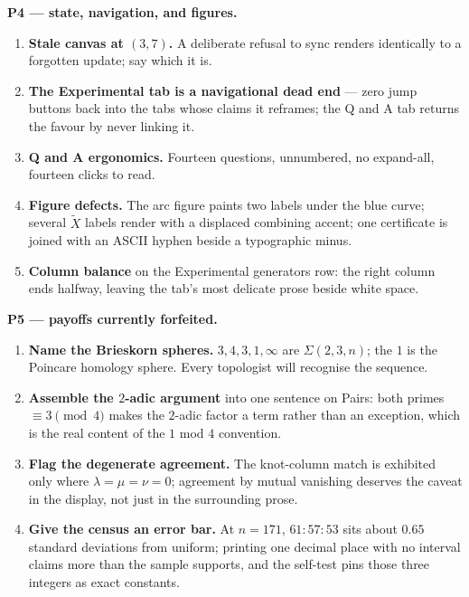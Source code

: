 \textbf{P4 --- state, navigation, and figures.}
\begin{enumerate}[leftmargin=1.4em,itemsep=2pt,resume]
\item \textbf{Stale canvas at $(3,7)$.} A deliberate refusal to sync renders identically to a forgotten update; say which it is.
\item \textbf{The Experimental tab is a navigational dead end} --- zero jump buttons back into the tabs whose claims it reframes; the Q and A tab returns the favour by never linking it.
\item \textbf{Q and A ergonomics.} Fourteen questions, unnumbered, no expand-all, fourteen clicks to read.
\item \textbf{Figure defects.} The arc figure paints two labels under the blue curve; several $\tilde{X}$ labels render with a displaced combining accent; one certificate is joined with an ASCII hyphen beside a typographic minus.
\item \textbf{Column balance} on the Experimental generators row: the right column ends halfway, leaving the tab's most delicate prose beside white space.
\end{enumerate}

\textbf{P5 --- payoffs currently forfeited.}
\begin{enumerate}[leftmargin=1.4em,itemsep=2pt,resume]
\item \textbf{Name the Brieskorn spheres.} $3, 4, 3, 1, \infty$ are $\Sigma(2,3,n)$; the $1$ is the Poincare homology sphere. Every topologist will recognise the sequence.
\item \textbf{Assemble the $2$-adic argument} into one sentence on Pairs: both primes $\equiv 3 \pmod 4$ makes the $2$-adic factor a term rather than an exception, which is the real content of the $1$ mod $4$ convention.
\item \textbf{Flag the degenerate agreement.} The knot-column match is exhibited only where $\lambda = \mu = \nu = 0$; agreement by mutual vanishing deserves the caveat in the display, not just in the surrounding prose.
\item \textbf{Give the census an error bar.} At $n = 171$, $61:57:53$ sits about $0.65$ standard deviations from uniform; printing one decimal place with no interval claims more than the sample supports, and the self-test pins those three integers as exact constants.
\end{enumerate}


